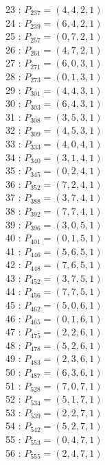 \documentclass{article}
\begin{document}
{\begin{multicols}{3}
23 : $P_{237}=( 4, 4, 2, 1 )$\\
24 : $P_{239}=( 6, 4, 2, 1 )$\\
25 : $P_{257}=( 0, 7, 2, 1 )$\\
26 : $P_{261}=( 4, 7, 2, 1 )$\\
27 : $P_{271}=( 6, 0, 3, 1 )$\\
28 : $P_{273}=( 0, 1, 3, 1 )$\\
29 : $P_{301}=( 4, 4, 3, 1 )$\\
30 : $P_{303}=( 6, 4, 3, 1 )$\\
31 : $P_{308}=( 3, 5, 3, 1 )$\\
32 : $P_{309}=( 4, 5, 3, 1 )$\\
33 : $P_{333}=( 4, 0, 4, 1 )$\\
34 : $P_{340}=( 3, 1, 4, 1 )$\\
35 : $P_{345}=( 0, 2, 4, 1 )$\\
36 : $P_{352}=( 7, 2, 4, 1 )$\\
37 : $P_{388}=( 3, 7, 4, 1 )$\\
38 : $P_{392}=( 7, 7, 4, 1 )$\\
39 : $P_{396}=( 3, 0, 5, 1 )$\\
40 : $P_{401}=( 0, 1, 5, 1 )$\\
41 : $P_{446}=( 5, 6, 5, 1 )$\\
42 : $P_{448}=( 7, 6, 5, 1 )$\\
43 : $P_{452}=( 3, 7, 5, 1 )$\\
44 : $P_{456}=( 7, 7, 5, 1 )$\\
45 : $P_{462}=( 5, 0, 6, 1 )$\\
46 : $P_{465}=( 0, 1, 6, 1 )$\\
47 : $P_{475}=( 2, 2, 6, 1 )$\\
48 : $P_{478}=( 5, 2, 6, 1 )$\\
49 : $P_{483}=( 2, 3, 6, 1 )$\\
50 : $P_{487}=( 6, 3, 6, 1 )$\\
51 : $P_{528}=( 7, 0, 7, 1 )$\\
52 : $P_{534}=( 5, 1, 7, 1 )$\\
53 : $P_{539}=( 2, 2, 7, 1 )$\\
54 : $P_{542}=( 5, 2, 7, 1 )$\\
55 : $P_{553}=( 0, 4, 7, 1 )$\\
56 : $P_{555}=( 2, 4, 7, 1 )$\\
\end{multicols}


%


%


}%
\end{document}
